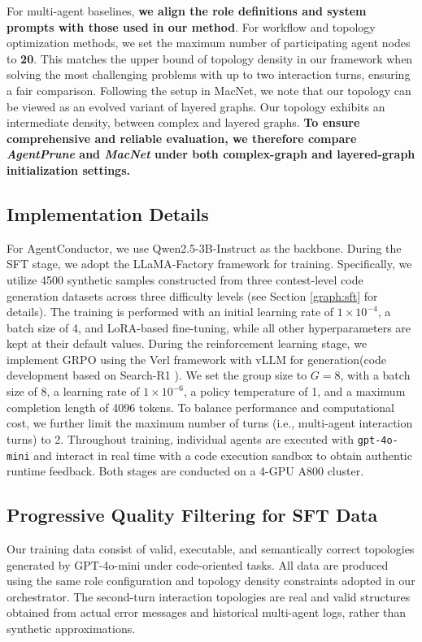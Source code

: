 \documentclass{article}
\theoremstyle{definition}
\begin{document}
For multi-agent baselines, \textbf{we align the role definitions and system prompts with those used in our method}. For workflow and topology optimization methods, we set the maximum number of participating agent nodes to \textbf{20}. This matches the upper bound of topology density in our framework when solving the most challenging problems with up to two interaction turns, ensuring a fair comparison. Following the setup in MacNet, we note that our topology can be viewed as an evolved variant of layered graphs. Our topology exhibits an intermediate density, between complex and layered graphs.  \textbf{To ensure comprehensive and reliable evaluation, we therefore compare \textit{AgentPrune} and \textit{MacNet} under both complex-graph and layered-graph initialization settings.}
\subsection{Implementation Details}
\label{appendix:Implementation Details}
For AgentConductor, we use Qwen2.5-3B-Instruct \citep{qwen2.5}  as
the backbone. During the SFT stage, we adopt the LLaMA-Factory framework \citep{zheng2024llamafactory} for training. Specifically, we utilize 4500 synthetic samples constructed from three contest-level code generation datasets across three difficulty levels (see Section \ref{graph:sft} for details). The training is performed with an initial learning rate of $1 \times 10^{-4}$, a batch size of 4, and LoRA-based fine-tuning, while all other hyperparameters are kept at their default values.
During the reinforcement learning stage, we implement GRPO using the Verl \citep{sheng2025hybridflow} framework with vLLM for generation(code development based on Search-R1 \citep{jin2025search}). We set the group size to $G=8$, with a batch size of 8, a learning rate of $1 \times 10^{-6}$, a policy temperature of 1, and a maximum completion length of 4096 tokens. To balance performance and computational cost, we further limit the maximum number of turns (i.e., multi-agent interaction turns) to 2. Throughout training, individual agents are executed with \texttt{gpt-4o-mini} and interact in real time with a code execution sandbox to obtain authentic runtime feedback. Both stages are conducted on a 4-GPU A800 cluster.
\subsection{Progressive Quality Filtering for SFT Data}
\label{appendix: sft_quality}
Our training data consist of valid, executable, and semantically correct topologies generated by GPT-4o-mini under code-oriented tasks. All data are produced using the same role configuration and topology density constraints adopted in our orchestrator. The second-turn interaction topologies are real and valid structures obtained from actual error messages and historical multi-agent logs, rather than synthetic approximations.
\end{document}
